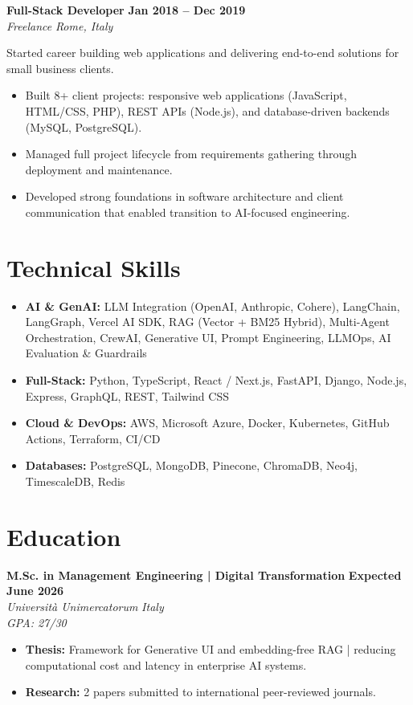 \documentclass[11pt, letterpaper]{article}
\begin{document}
\vspace{8pt}

\noindent \textbf{Full-Stack Developer} \hfill \textbf{Jan 2018 -- Dec 2019} \\
\textit{Freelance} \hfill \textit{Rome, Italy}
\vspace{4pt}

\noindent Started career building web applications and delivering end-to-end solutions for small business clients.
\begin{itemize}
    \item Built 8+ client projects: responsive web applications (JavaScript, HTML/CSS, PHP), REST APIs (Node.js), and database-driven backends (MySQL, PostgreSQL).
    \item Managed full project lifecycle from requirements gathering through deployment and maintenance.
    \item Developed strong foundations in software architecture and client communication that enabled transition to AI-focused engineering.
\end{itemize}

\section*{Technical Skills}
\begin{itemize}
    \item \textbf{AI \& GenAI:} LLM Integration (OpenAI, Anthropic, Cohere), LangChain, LangGraph, Vercel AI SDK, RAG (Vector + BM25 Hybrid), Multi-Agent Orchestration, CrewAI, Generative UI, Prompt Engineering, LLMOps, AI Evaluation \& Guardrails
    \item \textbf{Full-Stack:} Python, TypeScript, React / Next.js, FastAPI, Django, Node.js, Express, GraphQL, REST, Tailwind CSS
    \item \textbf{Cloud \& DevOps:} AWS, Microsoft Azure, Docker, Kubernetes, GitHub Actions, Terraform, CI/CD
    \item \textbf{Databases:} PostgreSQL, MongoDB, Pinecone, ChromaDB, Neo4j, TimescaleDB, Redis
\end{itemize}

\section*{Education}

\noindent \textbf{M.Sc. in Management Engineering | Digital Transformation} \hfill \textbf{Expected June 2026} \\
\textit{Universit\`a Unimercatorum} \hfill \textit{Italy} \\
\textit{GPA: 27/30}
\vspace{2pt}
\begin{itemize}
    \item \textbf{Thesis:} Framework for Generative UI and embedding-free RAG | reducing computational cost and latency in enterprise AI systems.
    \item \textbf{Research:} 2 papers submitted to international peer-reviewed journals.
\end{itemize}
\end{document}

